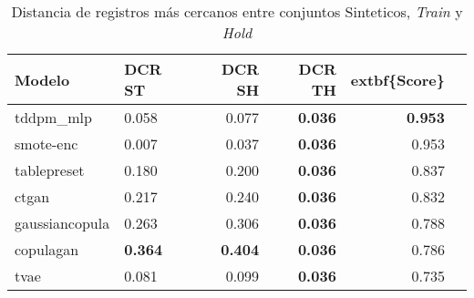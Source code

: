 \begin{table}[H]
\centering
\caption{Distancia de registros más cercanos entre conjuntos Sinteticos, \emph{Train} y \emph{Hold}}
\label{table-dcr-king county-a-1}
\begin{tabular}{|l|l|r|r|r|r|}
\hline
\rowcolor[gray]{0.8}
Modelo & DCR ST & DCR SH & DCR TH & 	extbf\{Score\} \\
\hline tddpm\_mlp & 0.058 & 0.077 & \bfseries 0.036 & \bfseries 0.953 \\
\hline smote-enc & \cellcolor{red} 0.007 & \cellcolor{red} 0.037 & \bfseries 0.036 & 0.953 \\
\hline tablepreset & 0.180 & 0.200 & \bfseries 0.036 & 0.837 \\
\hline ctgan & 0.217 & 0.240 & \bfseries 0.036 & 0.832 \\
\hline gaussiancopula & 0.263 & 0.306 & \bfseries 0.036 & 0.788 \\
\hline copulagan & \bfseries 0.364 & \bfseries 0.404 & \bfseries 0.036 & 0.786 \\
\hline tvae & 0.081 & 0.099 & \bfseries 0.036 & 0.735 \\
\hline
\end{tabular}
\end{table}
